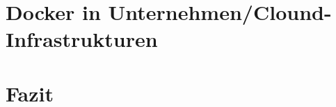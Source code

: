 \documentclass[11pt,a4paper,oneside]{report}
\begin{document}
\chapter{Docker in Unternehmen/Clound-Infrastrukturen}
\chapter{Fazit}




\appendix


\end{document}
